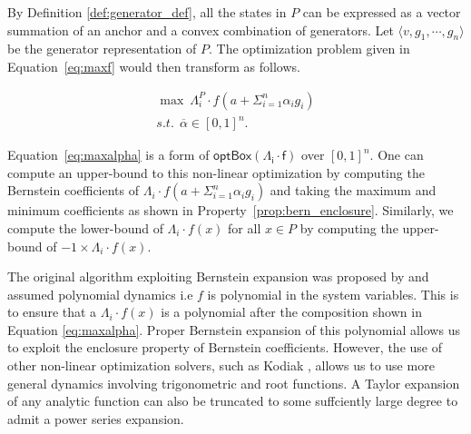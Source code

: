 By Definition \ref{def:generator_def}, all the states in $P$ can be expressed as a vector summation of an anchor and a convex combination of generators.
%
Let  $\langle v, g_1, \cdots, g_n \rangle$ be the generator representation of $P$.
%
The optimization problem given in Equation~\ref{eq:maxf} would then transform as follows.

\begin{eqnarray}
  \max ~ \Lambda_i^P \cdot f(a + \Sigma_{i=1}^{n} \alpha_i g_i) \label{eq:maxalpha}\\
  s.t. ~~ \overline\alpha \in [0,1]^{n}.\nonumber
\end{eqnarray}

Equation~\ref{eq:maxalpha} is a form of $\mathsf{optBox(\Lambda_{i} \cdot f)}$ over $[0,1]^n$.
%
One can compute an upper-bound to this non-linear optimization by computing the Bernstein coefficients of $\Lambda_i \cdot f(a + \Sigma_{i=1}^{n} \alpha_i g_i)$ and taking the maximum and minimum coefficients as shown in Property~\ref{prop:bern_enclosure}.
%
Similarly, we compute the lower-bound of $\Lambda_{i}\cdot f(x)$ for all $x \in P$ by computing the upper-bound of $-1 \times \Lambda_{i}\cdot f(x)$.
%
\begin{remark}
The original algorithm exploiting Bernstein expansion was proposed by \cite{dreossi2016parallelotope} and assumed polynomial dynamics i.e $f$ is polynomial in the system variables.
%
This is to ensure that a $\Lambda_{i}\cdot f(x)$ is a polynomial after the composition shown in Equation \ref{eq:maxalpha}. Proper Bernstein expansion of this polynomial allows us to exploit the enclosure property of Bernstein coefficients. However, the use of other non-linear optimization solvers, such as Kodiak \cite{kodiak}, allows us to use more general dynamics involving trigonometric and root functions. A Taylor expansion of any analytic function can also be truncated to some suffciently large degree to admit a power series expansion.
\end{remark}

